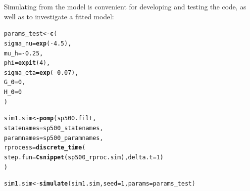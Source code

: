 \documentclass{beamer}\usepackage[]{graphicx}\usepackage[]{color}
\makeatletter
\newcommand{\hlnum}[1]{\textcolor[rgb]{0.686,0.059,0.569}{#1}}%
\newcommand{\hlopt}[1]{\textcolor[rgb]{0,0,0}{#1}}%
\newcommand{\hlstd}[1]{\textcolor[rgb]{0.345,0.345,0.345}{#1}}%
\newcommand{\hlkwb}[1]{\textcolor[rgb]{0.69,0.353,0.396}{#1}}%
\newcommand{\hlkwc}[1]{\textcolor[rgb]{0.333,0.667,0.333}{#1}}%
\newcommand{\hlkwd}[1]{\textcolor[rgb]{0.737,0.353,0.396}{\textbf{#1}}}%
\newenvironment{kframe}{%
 \def\at@end@of@kframe{}%
 \ifinner\ifhmode%
  \def\at@end@of@kframe{\end{minipage}}%
  \begin{minipage}{\columnwidth}%
 \fi\fi%
 \def\FrameCommand##1{\hskip\@totalleftmargin \hskip-\fboxsep
 \colorbox{shadecolor}{##1}\hskip-\fboxsep
     \hskip-\linewidth \hskip-\@totalleftmargin \hskip\columnwidth}%
 \MakeFramed {\advance\hsize-\width
   \@totalleftmargin\z@ \linewidth\hsize
   \@setminipage}}%
 {\par\unskip\endMakeFramed%
 \at@end@of@kframe}
\newenvironment{knitrout}{}{} %
\makeatother
\begin{document}
\begin{frame}[fragile]

\bi

\item Simulating from the model is convenient for developing and testing the code, as well as to investigate a fitted model:

\ei

\begin{knitrout}\small
{}\color{fgcolor}\begin{kframe}
\begin{alltt}
\hlstd{params_test} \hlkwb{<-} \hlkwd{c}\hlstd{(}
  \hlkwc{sigma_nu} \hlstd{=} \hlkwd{exp}\hlstd{(}\hlopt{-}\hlnum{4.5}\hlstd{),}
  \hlkwc{mu_h} \hlstd{=} \hlopt{-}\hlnum{0.25}\hlstd{,}
  \hlkwc{phi} \hlstd{=} \hlkwd{expit}\hlstd{(}\hlnum{4}\hlstd{),}
  \hlkwc{sigma_eta} \hlstd{=} \hlkwd{exp}\hlstd{(}\hlopt{-}\hlnum{0.07}\hlstd{),}
  \hlkwc{G_0} \hlstd{=} \hlnum{0}\hlstd{,}
  \hlkwc{H_0}\hlstd{=}\hlnum{0}
\hlstd{)}

\hlstd{sim1.sim} \hlkwb{<-} \hlkwd{pomp}\hlstd{(sp500.filt,}
  \hlkwc{statenames}\hlstd{=sp500_statenames,}
  \hlkwc{paramnames}\hlstd{=sp500_paramnames,}
  \hlkwc{rprocess}\hlstd{=}\hlkwd{discrete_time}\hlstd{(}
    \hlkwc{step.fun}\hlstd{=}\hlkwd{Csnippet}\hlstd{(sp500_rproc.sim),}\hlkwc{delta.t}\hlstd{=}\hlnum{1}\hlstd{)}
\hlstd{)}

\hlstd{sim1.sim} \hlkwb{<-} \hlkwd{simulate}\hlstd{(sim1.sim,}\hlkwc{seed}\hlstd{=}\hlnum{1}\hlstd{,}\hlkwc{params}\hlstd{=params_test)}
\end{alltt}
\end{kframe}
\end{knitrout}

\end{frame}
\end{document}

